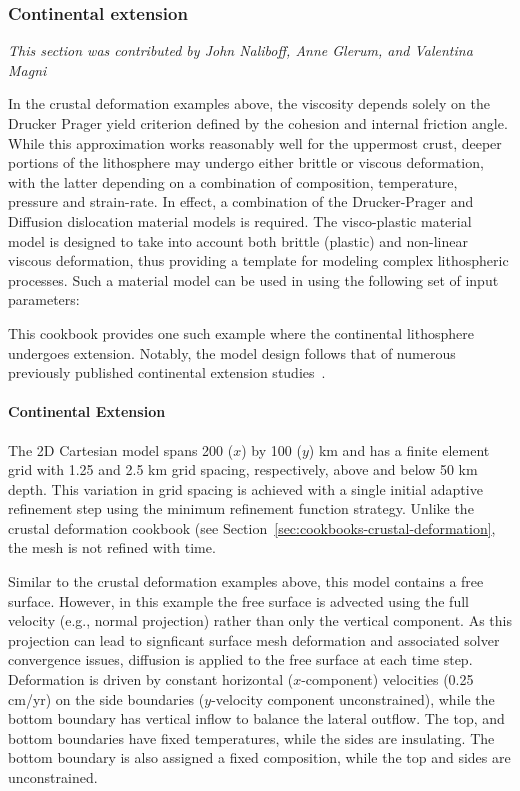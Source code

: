 \subsubsection{Continental extension}
\label{sec:cookbooks-continental-extension}
\textit{This section was contributed by John Naliboff, Anne Glerum, and Valentina Magni}

In the crustal deformation examples above, the viscosity depends solely on the Drucker Prager yield criterion defined by the cohesion and internal friction angle. While this approximation works reasonably well for the uppermost crust, deeper portions of the lithosphere may undergo either brittle or viscous deformation, with the latter depending on a combination of composition, temperature, pressure and strain-rate. In effect, a combination of the Drucker-Prager and Diffusion dislocation material models is required. The visco-plastic material model is designed to take into account both brittle (plastic) and non-linear viscous deformation, thus providing a template for modeling complex lithospheric processes. Such a material model can be used in \aspect{} using the following set of input parameters:



This cookbook provides one such example where the continental lithosphere undergoes extension. Notably, the model design follows that of numerous previously published continental extension studies~\cite[and references therein]{Hui11,Bru14,Nal15}.

\paragraph{Continental Extension}
The 2D Cartesian model spans 200 ($x$) by 100 ($y$) km and has a finite element grid with 1.25 and 2.5 km grid spacing, respectively, above and  below 50 km depth. This variation in grid spacing is achieved with a single initial adaptive refinement step using the minimum refinement function strategy. Unlike the crustal deformation cookbook (see Section~\ref{sec:cookbooks-crustal-deformation}, the mesh is not refined with time.




Similar to the crustal deformation examples above, this model contains a free surface. However, in this example the free surface is advected using the full velocity (e.g., normal projection) rather than only the vertical component. As this projection can lead to signficant surface mesh deformation and associated solver convergence issues, diffusion is applied to the free surface at each time step. Deformation is driven by constant horizontal ($x$-component) velocities (0.25 cm/yr) on the side boundaries ($y$-velocity component unconstrained), while the bottom boundary has vertical inflow to balance the lateral outflow. The top, and bottom boundaries have fixed temperatures, while the sides are insulating. The bottom boundary is also assigned a fixed composition, while the top and sides are unconstrained.

